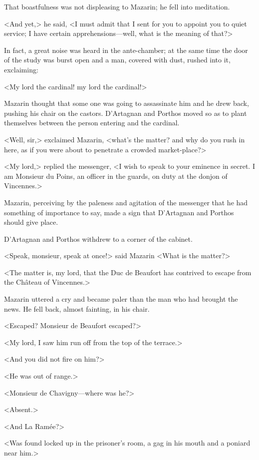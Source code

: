 That boastfulness was not displeasing to Mazarin; he fell into meditation.

<And yet,> he said, <I must admit that I sent for you to appoint you to quiet service; I have certain apprehensions—well, what is the meaning of that?>

In fact, a great noise was heard in the ante-chamber; at the same time the door of the study was burst open and a man, covered with dust, rushed into it, exclaiming:

<My lord the cardinal! my lord the cardinal!>

Mazarin thought that some one was going to assassinate him and he drew back, pushing his chair on the castors. D'Artagnan and Porthos moved so as to plant themselves between the person entering and the cardinal.

<Well, sir,> exclaimed Mazarin, <what's the matter? and why do you rush in here, as if you were about to penetrate a crowded market-place?>

<My lord,> replied the messenger, <I wish to speak to your eminence in secret. I am Monsieur du Poins, an officer in the guards, on duty at the donjon of Vincennes.>

Mazarin, perceiving by the paleness and agitation of the messenger that he had something of importance to say, made a sign that D'Artagnan and Porthos should give place.

D'Artagnan and Porthos withdrew to a corner of the cabinet.

<Speak, monsieur, speak at once!> said Mazarin <What is the matter?>

<The matter is, my lord, that the Duc de Beaufort has contrived to escape from the Château of Vincennes.>

Mazarin uttered a cry and became paler than the man who had brought the news. He fell back, almost fainting, in his chair.

<Escaped? Monsieur de Beaufort escaped?>

<My lord, I saw him run off from the top of the terrace.>

<And you did not fire on him?>

<He was out of range.>

<Monsieur de Chavigny—where was he?>

<Absent.>

<And La Ramée?>

<Was found locked up in the prisoner's room, a gag in his mouth and a poniard near him.>

